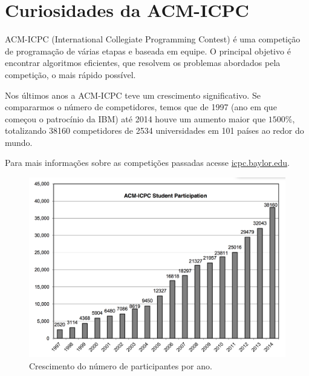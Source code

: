 
\chapter{Curiosidades da ACM-ICPC} %

\label{AppendixA} %

ACM-ICPC (International Collegiate Programming Contest) é uma competição de programação
de várias etapas e baseada em equipe. O principal objetivo é encontrar algoritmos
eficientes, que resolvem os problemas abordados pela competição, o mais rápido
possível.


Nos últimos anos a ACM-ICPC teve um crescimento significativo. Se compararmos
o número de competidores, temos que de 1997 (ano em que começou o patrocínio
da IBM) até 2014 houve um aumento maior que $1500\%$, totalizando 38160
competidores de 2534 universidades em 101 países ao redor do mundo.

Para mais informa\c{c}\~oes sobre as competi\c{c}\~oes passadas acesse \href{icpc.baylor.edu}{icpc.baylor.edu}.

\begin{figure}[!htb]
    \centering
    \includegraphics[width=1\linewidth]{Figures/grafico.png}
    \caption{Crescimento do n\'umero de participantes por ano.}
\end{figure}

